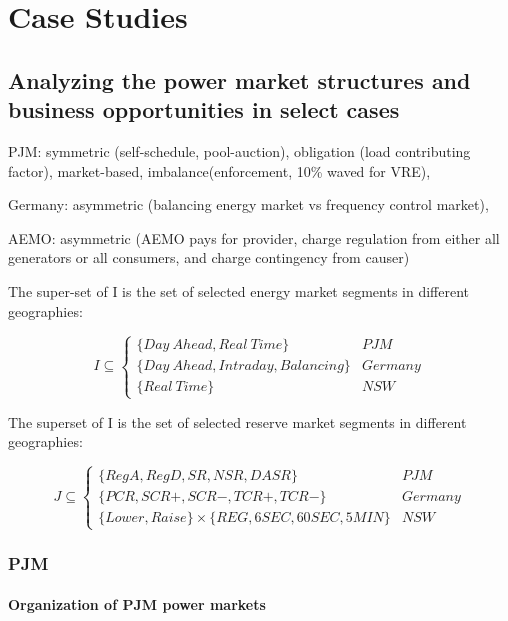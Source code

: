 \chapter{Case Studies}
\section{Analyzing the power market structures and business opportunities in select cases}
\label{sec:qualitative-analysis}

PJM: symmetric (self-schedule, pool-auction), obligation (load contributing factor), market-based, imbalance(enforcement, 10\% waved for VRE),

Germany: asymmetric (balancing energy market vs frequency control market), 

AEMO: asymmetric (AEMO pays for provider, charge regulation from either all generators or all consumers, and charge contingency from causer)


The super-set of I is the set of selected energy market segments in different geographies:

\begin{equation*}
I \subseteq  \begin{cases}
\{Day~Ahead, Real~Time\} & PJM \\
\{Day~Ahead, Intraday, Balancing\} & Germany \\
\{Real~Time\} & NSW
\end{cases}
\end{equation*}

The superset of I is the set of selected reserve market segments in different geographies:

\begin{equation*}
J \subseteq  \begin{cases}
\{RegA, RegD, SR, NSR, DASR\} & PJM \\
\{PCR, SCR+, SCR-, TCR+, TCR-\} & Germany \\
\{Lower, Raise\} \times \{REG, 6SEC, 60SEC, 5MIN\} & NSW
\end{cases}
\end{equation*}

\subsection{PJM}
\subsubsection{Organization of PJM power markets}


